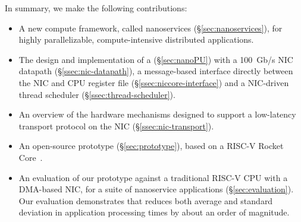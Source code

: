 In summary, we make the following contributions:
\begin{itemize}[topsep=0.4\baselineskip, leftmargin=20pt]
    \item A new compute framework, called nanoservices (\S\ref{sec:nanoservices}), for highly parallelizable, compute-intensive distributed applications.
    \item The design and implementation of a \name{} (\S\ref{sec:nanoPU}) with a \SI{100}{Gb/s} NIC datapath (\S\ref{ssec:nic-datapath}), a message-based interface directly between the NIC and CPU register file (\S\ref{ssec:niccore-interface}) and a NIC-driven thread scheduler (\S\ref{ssec:thread-scheduler}).
    \item An overview of the hardware mechanisms designed to support a low-latency transport protocol on the NIC (\S\ref{ssec:nic-transport}).
    \item An open-source \name{} prototype (\S\ref{sec:prototype}), based on a RISC-V Rocket Core~\cite{rocket-chip}.
    \item An evaluation of our \name{} prototype against a traditional RISC-V CPU with a DMA-based NIC, for a suite of nanoservice applications (\S\ref{sec:evaluation}). Our evaluation demonstrates that \name{} reduces both average and standard deviation in application processing times by about an order of magnitude.
\end{itemize}

